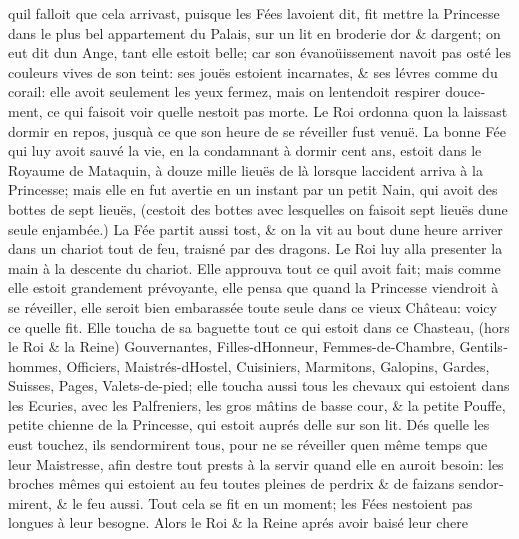 \documentclass[14pt,a4paper]{memoir}
\begin{document}
{{\begin{otherlanguage}{french}
qu\textquotesingle il falloit que cela arrivast, puisque les Fées
l\textquotesingle avoient dit, fit mettre la Princesse dans le plus bel
appartement du Palais, sur un lit en broderie d\textquotesingle or \&
d\textquotesingle argent; on eut dit d\textquotesingle un Ange, tant
elle estoit belle; car son évanoüissement n\textquotesingle avoit pas
osté les couleurs vives de son teint: ses jouës estoient incarnates, \&
ses lévres comme du corail: elle avoit seulement les yeux fermez, mais
on l\textquotesingle entendoit respirer doucement, ce qui faisoit voir
qu\textquotesingle elle n\textquotesingle estoit pas morte. Le Roi
ordonna qu\textquotesingle on la laissast dormir en repos,
jusqu\textquotesingle à ce que son heure de se réveiller fust venuë. La
bonne Fée qui luy avoit sauvé la vie, en la condamnant à dormir cent
ans, estoit dans le Royaume de Mataquin, à douze mille lieuës de là
lorsque l\textquotesingle accident arriva à la Princesse; mais elle en
fut avertie en un instant par un petit Nain, qui avoit des bottes de
sept lieuës, (c\textquotesingle estoit des bottes avec lesquelles on
faisoit sept lieuës d\textquotesingle une seule enjambée.) La Fée partit
aussi tost, \& on la vit au bout d\textquotesingle une heure arriver
dans un chariot tout de feu, traisné par des dragons. Le Roi luy alla
presenter la main à la descente du chariot. Elle approuva tout ce
qu\textquotesingle il avoit fait; mais comme elle estoit grandement
prévoyante, elle pensa que quand la Princesse viendroit à se réveiller,
elle seroit bien embarassée toute seule dans ce vieux Château: voicy ce
qu\textquotesingle elle fit. Elle toucha de sa baguette tout ce qui
estoit dans ce Chasteau, (hors le Roi \& la Reine) Gouvernantes,
Filles-d\textquotesingle Honneur, Femmes-de-Chambre, Gentilshommes,
Officiers, Maistrés-d\textquotesingle Hostel, Cuisiniers, Marmitons,
Galopins, Gardes, Suisses, Pages, Valets-de-pied; elle toucha aussi tous
les chevaux qui estoient dans les Ecuries, avec les Palfreniers, les
gros mâtins de basse cour, \& la petite Pouffe, petite chienne de la
Princesse, qui estoit auprés d\textquotesingle elle sur son lit. Dés
qu\textquotesingle elle les eust touchez, ils
s\textquotesingle endormirent tous, pour ne se réveiller
qu\textquotesingle en même temps que leur Maistresse, afin
d\textquotesingle estre tout prests à la servir quand elle en auroit
besoin: les broches mêmes qui estoient au feu toutes pleines de perdrix
\& de faizans s\textquotesingle endormirent, \& le feu aussi. Tout cela
se fit en un moment; les Fées n\textquotesingle estoient pas longues à
leur besogne. Alors le Roi \& la Reine aprés avoir baisé leur chere

\end{otherlanguage}}}
\end{document}
